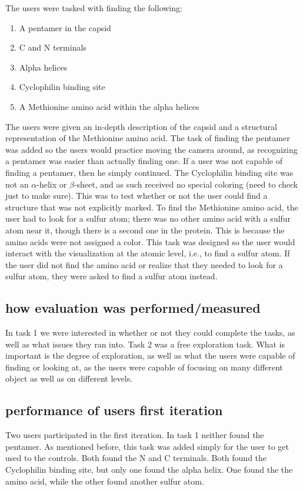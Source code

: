 \documentclass[review,journal]{vgtc}         %
\begin{document}
The users were tasked with finding the following:

\begin{enumerate}
	\item A pentamer in the capsid
	\item C and N terminals
	\item Alpha helices
	\item Cyclophilin binding site
	\item A Methionine amino acid within the alpha helices 
\end{enumerate}

The users were given an in-depth description of the capsid and a structural representation of the Methionine amino acid. 
The task of finding the pentamer was added so the users would practice moving the camera around, as recognizing a pentamer was easier than actually finding one. 
If a user was not capable of finding a pentamer, then he simply continued. 
The Cyclophilin binding site was not an $\alpha$-helix or $\beta$-sheet, and as such received no special coloring (need to check just to make sure). 
This was to test whether or not the user could find a structure that was not explicitly marked. 
To find the Methionine amino acid, the user had to look for a sulfur atom; there was no other amino acid with a sulfur atom near it, though there is a second one in the protein. 
This is because the amino acids were not assigned a color. 
This task was designed so the user would interact with the visualization at the atomic level, i.e., to find a sulfur atom. 
If the user did not find the amino acid or realize that they needed to look for a sulfur atom, they were asked to find a sulfur atom instead.





\subsection{how evaluation was performed/measured}
In task 1 we were interested in whether or not they could complete the tasks, as well as what issues they ran into. 
Task 2 was a free exploration task.
What is important is the degree of exploration, as well as what the users were capable of finding or looking at, as the users were capable of focusing on many different object as well as on different levels.


\subsection{performance of users first iteration}
Two users participated in the first iteration. In task 1 neither found the pentamer. 
As mentioned before, this task was added simply for the user to get used to the controls. 
Both found the N and C terminals. 
Both found the Cyclophilin binding site, but only one found the alpha helix. 
One found the the amino acid, while the other found another sulfur atom.
\end{document}
